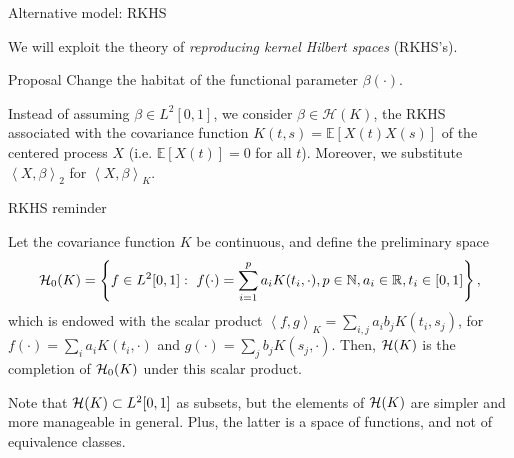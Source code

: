 \documentclass[10pt, english, professionalfonts]{beamer}
\newcommand\maroon[1]{\color{mLightBrown}#1\color{mDarkTeal}}
\newcommand{\N}{\mathbb{N}}
\newcommand{\R}{\mathbb{R}}
\newcommand{\E}{\mathbb{E}}
\newcommand{\Hcal}{\ensuremath\mathcal{H}}
\newcommand\dotprod[2]{\left\langle #1, #2 \right\rangle}
\begin{document}
\begin{frame}{Alternative model: RKHS}

We will exploit the theory of \textit{reproducing kernel Hilbert spaces} (RKHS's).

\vspace{1em}
\begin{alertblock}{Proposal}
  Change the habitat of the functional parameter \(\beta(\cdot)\).
\end{alertblock}

\vspace{1em}
  Instead of assuming \(\beta \in L^2[0, 1]\), we consider \maroon{\(\beta \in \mathcal H(K)\)}, the RKHS associated with the covariance function \(K(t, s)=\mathbb E[X(t)X(s)]\) of the centered process \(X\) (i.e. \(\E [X(t)]=0\) for all \(t\)). Moreover, we substitute \(\dotprod{X}{\beta}_2\) for \maroon{\(\dotprod{X}{\beta}_K\)}.
\end{frame}


\begin{frame}{RKHS reminder}
  \begin{definition}
    Let the covariance function \(K\) be continuous, and define the preliminary space
    \[
    \Hcal_0(K) = \left\{ f \in L^2[0,1]: \ f(\cdot) = \sum_{i=1}^p a_i K(t_i, \cdot),  p \in \N,  a_i \in \R,  t_i \in [0, 1] \right\},
    \]
    which is endowed with the scalar product \(\dotprod{f}{g}_K = \sum_{i, j} a_i b_j K(t_i, s_j)\), for \(f(\cdot)=\sum_i a_i K(t_i, \cdot) \) and \(g(\cdot)=\sum_j b_j K(s_j, \cdot)\). Then, \(\Hcal(K)\) is the completion of \(\Hcal_0(K)\) under this scalar product.
  \end{definition}

  \vspace{1em}

  Note that \(\Hcal(K)\subset L^2[0, 1]\) as subsets, but the elements of \(\Hcal(K)\) are simpler and more manageable in general. Plus, the latter is a space of \maroon{functions}, and not of equivalence classes.
\end{frame}
\end{document}
